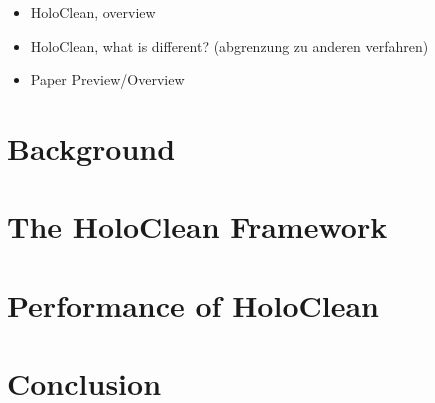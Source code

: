   \begin{itemize}
    \item HoloClean, overview
    \item HoloClean, what is different? (abgrenzung zu anderen verfahren)
    \item Paper Preview/Overview
  \end{itemize}
  

\section{Background}\label{sec:background}

\section{The HoloClean Framework}\label{sec:framework}

\section{Performance of HoloClean}\label{sec:performance}

\section{Conclusion}\label{sec:conclusion}